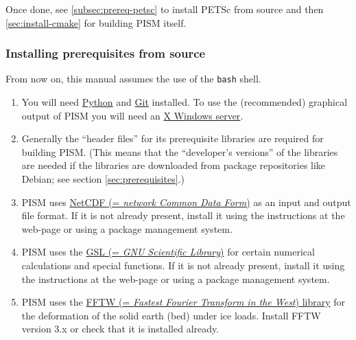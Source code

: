 \documentclass[titlepage,letterpaper,final]{scrartcl}
\begin{document}
Once done, see \ref{subsec:prereq-petsc} to install PETSc from source and then
\ref{sec:install-cmake} for building PISM itself.

\vspace{0.3in}


\subsubsection{Installing prerequisites from source}
\label{subsec:prereq-source}
\renewcommand{\labelenumi}{\textbf{\arabic{enumi}.}~}

From now on, this manual assumes the use of the \texttt{bash} shell.
\medskip

\begin{enumerate}
\item  You will need
  \href{http://www.python.org/}{Python} and \href{http://git-scm.com/}{Git}
  installed. To use
  the (recommended) graphical output of PISM you will need an
  \href{http://www.x.org/}{X Windows server}.

\item Generally the ``header files'' for its prerequisite libraries
  are required for building PISM.  (This means that the
  ``developer's versions'' of the libraries are needed if the libraries are
  downloaded from package repositories like Debian; see section \ref{sec:prerequisites}.)

\item PISM uses \href{http://www.unidata.ucar.edu/software/netcdf/}{NetCDF (=
  \emph{network Common Data Form})} as an input and output
  file format. If it is not already present, install it using the instructions
  at the web-page or using a package management system.

\item PISM uses the \href{http://www.gnu.org/software/gsl/}{GSL (= \emph{GNU
      Scientific Library})} for
  certain numerical calculations and special functions. If it is not already
  present, install it using the instructions at the web-page or using a package
  management system.

\item PISM uses the \href{http://www.fftw.org/}{FFTW
 (= \emph{Fastest Fourier Transform in the West}) library} for the
  deformation of the solid earth (bed) under ice loads.  Install FFTW version
  3.x or check that it is installed already.


\end{enumerate}
\end{document}
